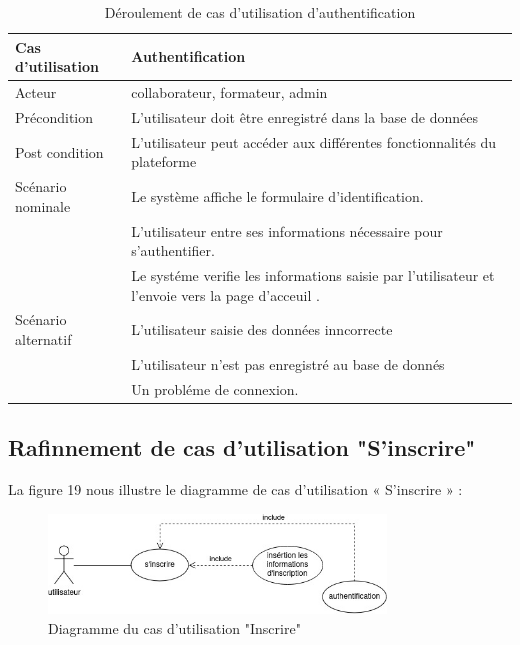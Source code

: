 \begin{table}[h]
    \begin{center} 
    \begin{tabular}{|p{4cm}|p{9cm}|}  \hline 
       Cas d'utilisation& Authentification \\ \hline
       Acteur&collaborateur, formateur, admin \\ \hline
       Précondition&  L’utilisateur doit être enregistré dans la base
       de données      \\ \hline
       Post condition& L’utilisateur peut accéder aux différentes fonctionnalités du plateforme \\ \hline
       Scénario nominale&Le système affiche le formulaire d’identification. \\
       &L'utilisateur entre ses informations nécessaire pour s'authentifier.\\
          & Le systéme verifie les informations saisie par l'utilisateur et l'envoie vers la page d'acceuil .\\ \hline
       Scénario alternatif&      
        L'utilisateur saisie des données inncorrecte \\
         & L'utilisateur n'est pas enregistré au base de donnés \\
         & Un probléme de connexion.
          
     \\ \hline
  \end{tabular}
  \end{center}

  \caption{ Déroulement de cas d'utilisation d'authentification}
\label{tab:bert_res}
\end{table}



















\subsection{Rafinnement de cas d'utilisation "S'inscrire"}
La figure 19 nous illustre le diagramme de cas d’utilisation « S’inscrire » :

\begin{figure}[!h]
\center%
\includegraphics[width=0.8\textwidth]{pages/image/asma-usecase-inscrire.jpg}
\caption{Diagramme du cas d'utilisation "Inscrire"}
\end{figure}


